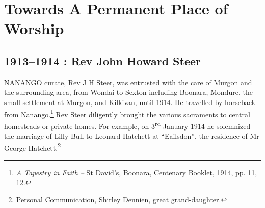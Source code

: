 \balance


\printendnotes[custom]
\setcounter{endnote}{0}
\chapter{Towards A Permanent Place of Worship}
\nobalance


\section{1913--1914 : Rev John Howard Steer}



\lettrine[lines=3]{N}{ANANGO}
 curate, Rev J H Steer, was entrusted with the care of Murgon and the surrounding area, from Wondai to Sexton including Boonara, Mondure, the small settlement at Murgon, and Kilkivan, until 1914. He travelled by horseback from Nanango.\footnote{\emph{A Tapestry in Faith --} St David's, Boonara, Centenary Booklet, 1914, pp. 11, 12.} Rev Steer diligently brought the various sacraments to central homesteads or private homes. For example, on 3\textsuperscript{rd} January 1914 he solemnized the marriage of Lilly Bull to Leonard Hatchett at ``Eailsdon'', the residence of Mr George Hatchett.\footnote{Personal Communication, Shirley Dennien, great grand-daughter.}







